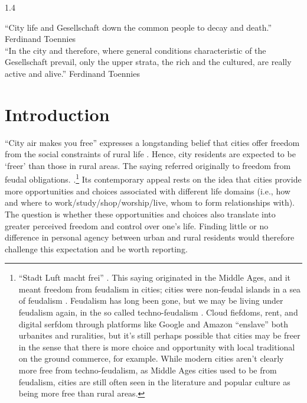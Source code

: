 \documentclass[10pt, letterpaper]{article}
\begin{document}
\begin{spacing}{1.4} 


\noindent ``City life and Gesellschaft down the common people to decay and death.'' Ferdinand Toennies\\

\noindent ``In the city and therefore, where general conditions characteristic of the Gesellschaft prevail, only the upper strata, the rich and the cultured, are really active and alive.'' Ferdinand Toennies\\ %

\section{Introduction}

``City air makes you free'' expresses a longstanding belief that cities offer freedom from the social constraints of rural life \citep{yamagishi12}. Hence, city residents are expected to be `freer' than those in rural areas. 
The saying referred originally to freedom from feudal obligations\citep{harvey12,park84}.
 \citep{yamagishi12}.\footnote{``Stadt Luft macht frei'' \citep[p. 12]{park84}. This saying originated in the Middle Ages, and it meant freedom from feudalism in cities; cities were non-feudal islands in a sea of feudalism \citep{harvey12}. Feudalism has long been gone, but we may be living under feudalism again, in the so called techno-feudalism \citep{varoufakis24,morozov2022critique}.
{Cloud  fiefdoms, rent, and digital serfdom through platforms like Google and Amazon ``enslave'' both urbanites and ruralities, but it's still perhaps possible that cities may be freer in the sense that there is more choice and opportunity with local traditional on the ground commerce, for example.}
%
While modern cities aren't clearly more free from techno-feudalism, as Middle Ages cities used to be from feudalism, cities are still often seen in the literature and popular culture as being more free than rural areas.}
Its contemporary appeal rests on the idea that cities provide more opportunities and choices associated with different life domains (i.e., how and where to work/study/shop/worship/live, whom to form relationships with). The question is whether these opportunities and choices also translate into greater perceived freedom and control over one's life. Finding little or no difference in personal agency between urban and rural residents would therefore challenge this expectation and be worth reporting.


\end{spacing}
\end{document}
